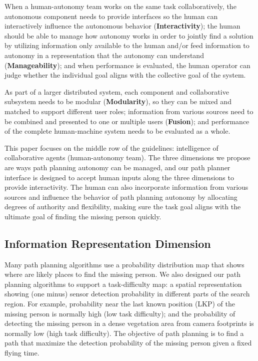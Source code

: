 When a human-autonomy team works on the same task collaboratively, the autonomous component needs to provide interfaces so the human can interactively influence the autonomous behavior (\textbf{Interactivity}); the human should be able to manage how autonomy works in order to jointly find a solution by utilizing information only available to the human and/or feed information to autonomy in a representation that the autonomy can understand (\textbf{Manageability}); and when performance is evaluated, the human operator can judge whether the individual goal aligns with the collective goal of the system. 

As part of a larger distributed system, each component and collaborative subsystem needs to be modular (\textbf{Modularity}), so they can be mixed and matched to support different user roles; information from various sources need to be combined and presented to one or multiple users (\textbf{Fusion}); and performance of the complete human-machine system needs to be evaluated as a whole. 

This paper focuses on the middle row of the guidelines: intelligence of collaborative agents (human-autonomy team). The three dimensions we propose are ways path planning autonomy can be managed, and our path planner interface is designed to accept human inputs along the three dimensions to provide interactivity. The human can also incorporate information from various sources and influence the behavior of path planning autonomy by allocating degrees of authority and flexibility, making sure the task goal aligns with the ultimate goal of finding the missing person quickly.

\subsection{Information Representation Dimension}

Many path planning algorithms use a probability distribution map that shows where are likely places to find the missing person. We also designed our path planning algorithms to support a task-difficulty map: a spatial representation showing (one minus) sensor detection probability in different parts of the search region. For example, probability near the last known position (LKP) of the missing person is normally high (low task difficulty); and the probability of detecting the missing person in a dense vegetation area from camera footprints is normally low (high task difficulty). The objective of path planning is to find a path that maximize the detection probability of the missing person given a fixed flying time. 

